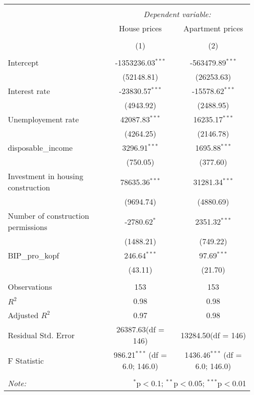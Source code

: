 \begin{table}[!htbp] \centering
\begin{tabular}{@{\extracolsep{5pt}}lcc}
\\[-1.8ex]\hline
\hline \\[-1.8ex]
& \multicolumn{2}{c}{\textit{Dependent variable:}} \
\cr \cline{2-3}
\\[-1.8ex] & \multicolumn{1}{c}{House prices} & \multicolumn{1}{c}{Apartment prices}  \\
\\[-1.8ex] & (1) & (2) \\
\hline \\[-1.8ex]
 Intercept & -1353236.03$^{***}$ & -563479.89$^{***}$ \\
  & (52148.81) & (26253.63) \\
 Interest rate & -23830.57$^{***}$ & -15578.62$^{***}$ \\
  & (4943.92) & (2488.95) \\
 Unemployement rate & 42087.83$^{***}$ & 16235.17$^{***}$ \\
  & (4264.25) & (2146.78) \\
 disposable_income & 3296.91$^{***}$ & 1695.88$^{***}$ \\
  & (750.05) & (377.60) \\
 Investment in housing construction & 78635.36$^{***}$ & 31281.34$^{***}$ \\
  & (9694.74) & (4880.69) \\
 Number of construction permissions & -2780.62$^{*}$ & 2351.32$^{***}$ \\
  & (1488.21) & (749.22) \\
 BIP_pro_kopf & 246.64$^{***}$ & 97.69$^{***}$ \\
  & (43.11) & (21.70) \\
\hline \\[-1.8ex]
 Observations & 153 & 153 \\
 $R^2$ & 0.98 & 0.98 \\
 Adjusted $R^2$ & 0.97 & 0.98 \\
 Residual Std. Error & 26387.63(df = 146) & 13284.50(df = 146)  \\
 F Statistic & 986.21$^{***}$ (df = 6.0; 146.0) & 1436.46$^{***}$ (df = 6.0; 146.0) \\
\hline
\hline \\[-1.8ex]
\textit{Note:} & \multicolumn{2}{r}{$^{*}$p$<$0.1; $^{**}$p$<$0.05; $^{***}$p$<$0.01} \\
\end{tabular}
\end{table}